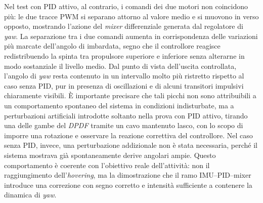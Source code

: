 \documentclass[11pt]{report}
\begin{document}
	Nel test con PID attivo, al contrario, i comandi dei due motori non coincidono più: le due tracce PWM si separano attorno al valore medio e si muovono in verso opposto, mostrando l'azione del \textit{mixer} differenziale generata dal regolatore di \textit{yaw}. La separazione tra i due comandi aumenta in corrispondenza delle variazioni più marcate dell'angolo di imbardata, segno che il controllore reagisce redistribuendo la spinta tra propulsore superiore e inferiore senza alterarne in modo sostanziale il livello medio. Dal punto di vista dell'uscita controllata, l'angolo di \textit{yaw} resta contenuto in un intervallo molto più ristretto rispetto al caso senza PID, pur in presenza di oscillazioni e di alcuni transitori impulsivi chiaramente visibili. È importante precisare che tali picchi non sono attribuibili a un comportamento spontaneo del sistema in condizioni indisturbate, ma a perturbazioni artificiali introdotte soltanto nella prova con PID attivo, tirando una delle gambe del \textit{DPDF} tramite un cavo mantenuto lasco, con lo scopo di imporre una rotazione e osservare la reazione correttiva del controllore. Nel caso senza PID, invece, una perturbazione addizionale non è stata necessaria, perché il sistema mostrava già spontaneamente derive angolari ampie. Questo comportamento è coerente con l'obiettivo reale dell'attività: non il raggiungimento dell'\textit{hovering}, ma la dimostrazione che il ramo IMU--PID--mixer introduce una correzione con segno corretto e intensità sufficiente a contenere la dinamica di \textit{yaw}.
	
\end{document}
